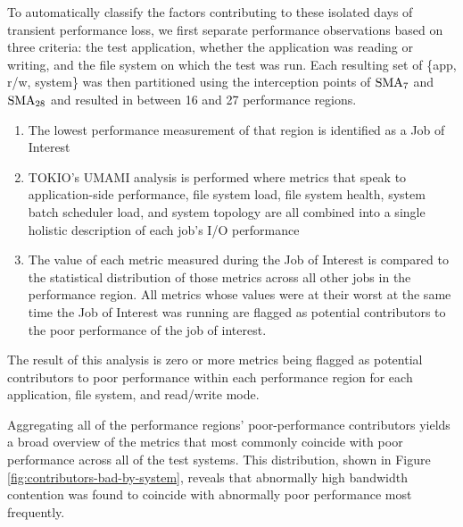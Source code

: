To automatically classify the factors contributing to these isolated days of transient performance loss, we first separate performance observations based on three criteria: the test application, whether the application was reading or writing, and the file system on which the test was run.
Each resulting set of \{app, r/w, system\} was then partitioned using the interception points of $\textup{SMA}_{7}$ and $\textup{SMA}_{28}$ and resulted in between 16 and 27 performance regions.


\begin{enumerate}[leftmargin=*]
\item The lowest performance measurement of that region is identified as a Job of Interest
\item TOKIO's UMAMI analysis is performed where metrics that speak to application-side performance, file system load, file system health, system batch scheduler load, and system topology are all combined into a single holistic description of each job's I/O performance
\item The value of each metric measured during the Job of Interest is compared to the statistical distribution of those metrics across all other jobs in the performance region.  All metrics whose values were at their worst at the same time the Job of Interest was running are flagged as potential contributors to the poor performance of the job of interest.
\end{enumerate}

The result of this analysis is zero or more metrics being flagged as potential contributors to poor performance within each performance region for each application, file system, and read/write mode.

Aggregating all of the performance regions' poor-performance contributors yields a broad overview of the metrics that most commonly coincide with poor performance across all of the test systems.
This distribution, shown in Figure \ref{fig:contributors-bad-by-system}, reveals that abnormally high bandwidth contention was found to coincide with abnormally poor performance most frequently.


